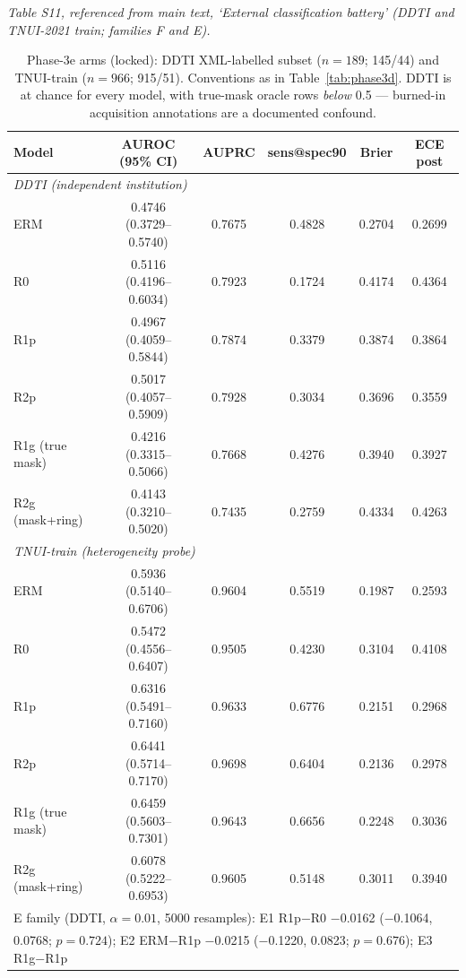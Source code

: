 \documentclass[11pt]{article}
\begin{document}
\noindent\emph{Table S11, referenced from main text, `External classification battery' (DDTI and TNUI-2021 train; families F and E).}

\begin{table}[!ht]
\centering\footnotesize
\caption{Phase-3e arms (locked): DDTI XML-labelled subset ($n{=}189$;
145/44) and TNUI-train ($n{=}966$; 915/51). Conventions as in
Table~\ref{tab:phase3d}. DDTI is at chance for every model, with true-mask
oracle rows \emph{below} 0.5 --- burned-in acquisition annotations are a
documented confound.}
\label{tab:phase3e}
\begin{tabular}{lccccc}
\toprule
Model & AUROC (95\% CI) & AUPRC & sens@spec90 & Brier & ECE post \\
\midrule
\multicolumn{6}{l}{\emph{DDTI (independent institution)}}\\
ERM  & 0.4746 (0.3729--0.5740) & 0.7675 & 0.4828 & 0.2704 & 0.2699 \\
R0   & 0.5116 (0.4196--0.6034) & 0.7923 & 0.1724 & 0.4174 & 0.4364 \\
R1p  & 0.4967 (0.4059--0.5844) & 0.7874 & 0.3379 & 0.3874 & 0.3864 \\
R2p  & 0.5017 (0.4057--0.5909) & 0.7928 & 0.3034 & 0.3696 & 0.3559 \\
R1g (true mask)  & 0.4216 (0.3315--0.5066) & 0.7668 & 0.4276 & 0.3940 & 0.3927 \\
R2g (mask+ring)  & 0.4143 (0.3210--0.5020) & 0.7435 & 0.2759 & 0.4334 & 0.4263 \\
\midrule
\multicolumn{6}{l}{\emph{TNUI-train (heterogeneity probe)}}\\
ERM  & 0.5936 (0.5140--0.6706) & 0.9604 & 0.5519 & 0.1987 & 0.2593 \\
R0   & 0.5472 (0.4556--0.6407) & 0.9505 & 0.4230 & 0.3104 & 0.4108 \\
R1p  & 0.6316 (0.5491--0.7160) & 0.9633 & 0.6776 & 0.2151 & 0.2968 \\
R2p  & 0.6441 (0.5714--0.7170) & 0.9698 & 0.6404 & 0.2136 & 0.2978 \\
R1g (true mask)  & 0.6459 (0.5603--0.7301) & 0.9643 & 0.6656 & 0.2248 & 0.3036 \\
R2g (mask+ring)  & 0.6078 (0.5222--0.6953) & 0.9605 & 0.5148 & 0.3011 & 0.3940 \\
\midrule
\multicolumn{6}{l}{E family (DDTI, $\alpha{=}0.01$, 5000 resamples): E1 R1p$-$R0 $-$0.0162 ($-$0.1064,}\\
\multicolumn{6}{l}{0.0768; $p{=}0.724$); E2 ERM$-$R1p $-$0.0215 ($-$0.1220, 0.0823; $p{=}0.676$); E3 R1g$-$R1p}\\

\end{tabular}
\end{table}
\end{document}
